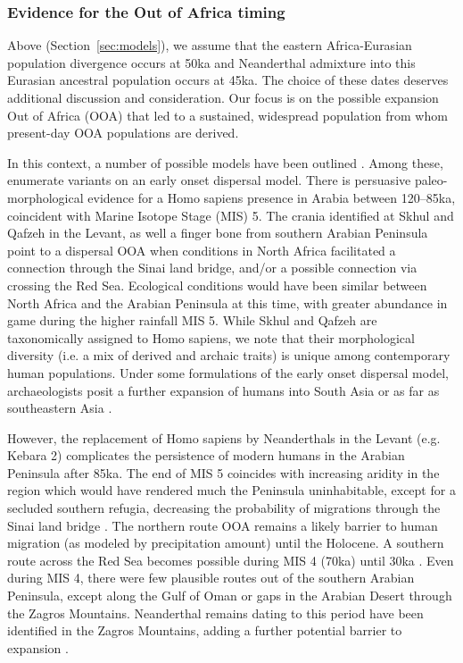 \documentclass[]{article}
\begin{document}
\subsubsection{Evidence for the Out of Africa timing}

Above (Section~\ref{sec:models}), we assume that the eastern Africa-Eurasian
population divergence occurs at 50ka and Neanderthal admixture into this
Eurasian ancestral population occurs at 45ka. The choice of these dates
deserves additional discussion and consideration. Our focus is on the possible
expansion Out of Africa (OOA) that led to a sustained, widespread population
from whom present-day OOA populations are derived.

In this context, a number of possible models have been outlined
\citep{Groucutt2015-do}. Among these, \citeauthor{Groucutt2015-do} enumerate
variants on an early onset dispersal model. There is persuasive
paleo-morphological evidence for a Homo sapiens presence in Arabia between
120--85ka, coincident with Marine Isotope Stage (MIS) 5. The crania identified
at Skhul and Qafzeh in the Levant, as well a finger bone from southern Arabian
Peninsula point to a dispersal OOA when conditions in North Africa facilitated
a connection through the Sinai land bridge, and/or a possible connection via
crossing the Red Sea. Ecological conditions would have been similar between
North Africa and the Arabian Peninsula at this time, with greater abundance in
game during the higher rainfall MIS 5. While Skhul and Qafzeh are taxonomically
assigned to Homo sapiens, we note that their morphological diversity (i.e. a
mix of derived and archaic traits) is unique among contemporary human
populations. Under some formulations of the early onset dispersal model,
archaeologists posit a further expansion of humans into South Asia or as far as
southeastern Asia \citep{Groucutt2015-do}.

However, the replacement of Homo sapiens by Neanderthals in the Levant (e.g.
Kebara 2) complicates the persistence of modern humans in the Arabian Peninsula
after 85ka. The end of MIS 5 coincides with increasing aridity in the region
which would have rendered much the Peninsula uninhabitable, except for a
secluded southern refugia, decreasing the probability of migrations through the
Sinai land bridge \citep{Beyer2021-ym}. The northern route OOA remains a likely
barrier to human migration (as modeled by precipitation amount) until the
Holocene. A southern route across the Red Sea becomes possible during MIS 4
(70ka) until 30ka \citep{Beyer2021-ym}. Even during MIS 4, there were few
plausible routes out of the southern Arabian Peninsula, except along the Gulf
of Oman or gaps in the Arabian Desert through the Zagros Mountains. Neanderthal
remains dating to this period have been identified in the Zagros Mountains,
adding a further potential barrier to expansion
\citep{Yousefi2020-et,Heydari-Guran2021-xy}. 
\end{document}

